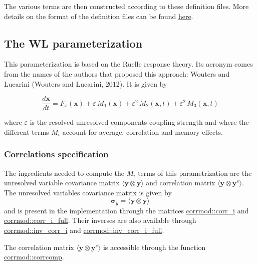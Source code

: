 The various terms are then constructed according to these definition files. More details on the format of the definition files can be found \hyperlink{md_doc_def_doc}{here}. 



\subsection*{The WL parameterization}

This parameterization is based on the Ruelle response theory. Its acronym comes from the names of the authors that proposed this approach\+: Wouters and Lucarini (Wouters and Lucarini, 2012). It is given by

\[\frac{d\boldsymbol{x}}{dt} = F_x(\boldsymbol{x}) + \varepsilon \, M_1(\boldsymbol{x}) + \varepsilon^2 \, M_2(\boldsymbol{x},t) + \varepsilon^2 \, M_3 (\boldsymbol{x},t)\]

where $\varepsilon$ is the resolved-\/unresolved components coupling strength and where the different terms $M_i$ account for average, correlation and memory effects.

\subsubsection*{Correlations specification}

The ingredients needed to compute the $M_i$ terms of this parametrization are the unresolved variable covariance matrix $\langle \boldsymbol y \otimes \boldsymbol y \rangle$ and correlation matrix $\langle \boldsymbol y \otimes \boldsymbol y^s \rangle$. The unresolved variables covariance matrix is given by \[\boldsymbol\sigma_y = \langle \boldsymbol y \otimes \boldsymbol y \rangle \] and is present in the implementation through the matrices \hyperlink{namespacecorrmod_a859a67113b5271db0df70e60cbf0687b}{corrmod\+::corr\+\_\+i} and \hyperlink{namespacecorrmod_a978b78f1d6906afe06e63768535b44f7}{corrmod\+::corr\+\_\+i\+\_\+full}. Their inverses are also available through \hyperlink{namespacecorrmod_a5a938587078064124588605255e93a19}{corrmod\+::inv\+\_\+corr\+\_\+i} and \hyperlink{namespacecorrmod_af2ab9712d246a94ae1a801a011aee3d8}{corrmod\+::inv\+\_\+corr\+\_\+i\+\_\+full}.

The correlation matrix $\langle \boldsymbol y \otimes \boldsymbol y^s \rangle$ is accessible through the function \hyperlink{namespacecorrmod_ad42bfc9c0ec2cf55958a45b46839d856}{corrmod\+::corrcomp}.

